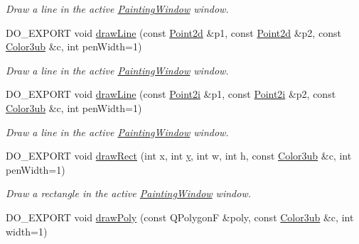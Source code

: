 \begin{DoxyCompactItemize}
\begin{DoxyCompactList}\small\item\em Draw a line in the active \hyperlink{class_d_o_1_1_painting_window}{Painting\-Window} window. \end{DoxyCompactList}\item 
D\-O\-\_\-\-E\-X\-P\-O\-R\-T void \hyperlink{group___draw2_d_ga89406d15592ca2c54fa17468c6ce7fa3}{draw\-Line} (const \hyperlink{group___eigen_typedefs_ga17451c1ba65dc5ceb1f90e1fc710fa24}{Point2d} \&p1, const \hyperlink{group___eigen_typedefs_ga17451c1ba65dc5ceb1f90e1fc710fa24}{Point2d} \&p2, const \hyperlink{group___color_types_ga018b76cd00a4f9dca7dd06246d5bd3aa}{Color3ub} \&c, int pen\-Width=1)
\begin{DoxyCompactList}\small\item\em Draw a line in the active \hyperlink{class_d_o_1_1_painting_window}{Painting\-Window} window. \end{DoxyCompactList}\item 
D\-O\-\_\-\-E\-X\-P\-O\-R\-T void \hyperlink{group___draw2_d_ga949db317830adf652591ff57a1f23a4b}{draw\-Line} (const \hyperlink{group___eigen_typedefs_ga048a27763e58f682b1b91af86144f701}{Point2i} \&p1, const \hyperlink{group___eigen_typedefs_ga048a27763e58f682b1b91af86144f701}{Point2i} \&p2, const \hyperlink{group___color_types_ga018b76cd00a4f9dca7dd06246d5bd3aa}{Color3ub} \&c, int pen\-Width=1)
\begin{DoxyCompactList}\small\item\em Draw a line in the active \hyperlink{class_d_o_1_1_painting_window}{Painting\-Window} window. \end{DoxyCompactList}\item 
D\-O\-\_\-\-E\-X\-P\-O\-R\-T void \hyperlink{group___draw2_d_ga9b53d46ef158cd6e3cbe1bf7a7845b30}{draw\-Rect} (int x, int \hyperlink{group___channel_accessors_gac90c52c5b3a7b2a7e3761e6e84f25778}{y}, int w, int h, const \hyperlink{group___color_types_ga018b76cd00a4f9dca7dd06246d5bd3aa}{Color3ub} \&c, int pen\-Width=1)
\begin{DoxyCompactList}\small\item\em Draw a rectangle in the active \hyperlink{class_d_o_1_1_painting_window}{Painting\-Window} window. \end{DoxyCompactList}\item 
D\-O\-\_\-\-E\-X\-P\-O\-R\-T void \hyperlink{group___draw2_d_ga52558e3f2f1212919480f8bbae221782}{draw\-Poly} (const Q\-Polygon\-F \&poly, const \hyperlink{group___color_types_ga018b76cd00a4f9dca7dd06246d5bd3aa}{Color3ub} \&c, int width=1)

\end{DoxyCompactItemize}
